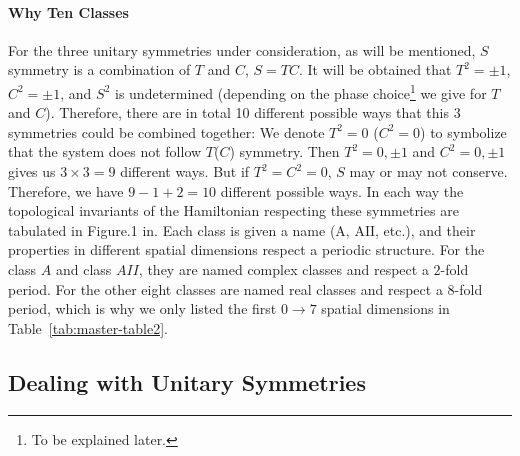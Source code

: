 \paragraph{Why Ten Classes} For the three unitary symmetries under
consideration, as will be mentioned, $S$ symmetry is a combination of $T$ and
$C$, $S=TC$. It will be obtained that $T^2=\pm 1$, $C^2=\pm 1$, and $S^2$ is
undetermined (depending on the phase choice\footnote{To be explained later.} we
give for $T$ and $C$). Therefore, there are in total 10 different possible ways
that this 3 symmetries could be combined together: We denote $T^2=0$ ($C^2=0$)
to symbolize that the system does not follow $T$($C$) symmetry. Then
$T^2=0,\pm1$ and $C^2=0,\pm1$ gives us $3\times 3=9$ different ways. But if
$T^2=C^2=0$, $S$ may or may not conserve. Therefore, we have $9-1+2=10$
different possible ways. In each way the topological invariants of the
Hamiltonian respecting these symmetries are tabulated in Figure.1
in\cite{Ludwig2016}. Each class is given a name ($\mathrm{A}$, $\mathrm{AII}$,
etc.), and their properties in different spatial dimensions respect a periodic
structure. For the class $A$ and class $AII$, they are named complex classes and
respect a $2$-fold period. For the other eight classes are named real classes
and respect a $8$-fold period, which is why we only listed the first $0\to 7$
spatial dimensions in Table~\ref{tab:master-table2}.

\subsection{Dealing with Unitary Symmetries}
\label{sec:Dealing with Unitary Symmetries}

